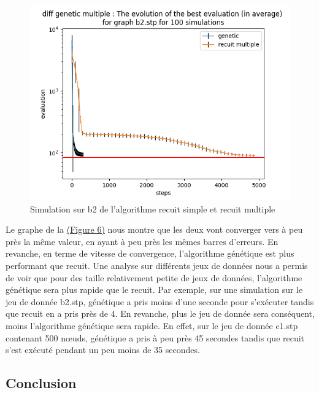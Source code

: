 \documentclass[11pt,french]{report}
\begin{document}
        \begin{figure}
          \begin{center}
            \includegraphics[width=1\textwidth]{best_b2_evaluation_diff genetic multiple.png}
          \end{center}
          \caption{Simulation sur b2 de l'algorithme recuit simple et recuit multiple}
          \label{Figure6}
        \end{figure}

        Le graphe de la \hyperref[Figure6]{(Figure 6)} nous montre que les deux vont converger vers à peu près la même valeur, en ayant à peu près les mêmes barres d'erreurs. En revanche, en terme de vitesse de convergence, l'algorithme génétique est plus performant que recuit.
        Une analyse sur différents jeux de données nous a permis de voir que pour des taille relativement petite de jeux de données, l'algorithme génétique sera plus rapide que le recuit. Par exemple, sur une simulation sur le jeu de donnée b2.stp, génétique a pris moins d'une seconde pour s'exécuter tandis que recuit en a pris près de 4.
        En revanche, plus le jeu de donnée sera conséquent, moins l'algorithme génétique sera rapide. En effet, sur le jeu de donnée c1.stp contenant 500 nœuds, génétique a pris à peu près 45 secondes tandis que recuit s'est exécuté pendant un peu moins de 35 secondes.


        \subsection{Conclusion}
\end{document}
